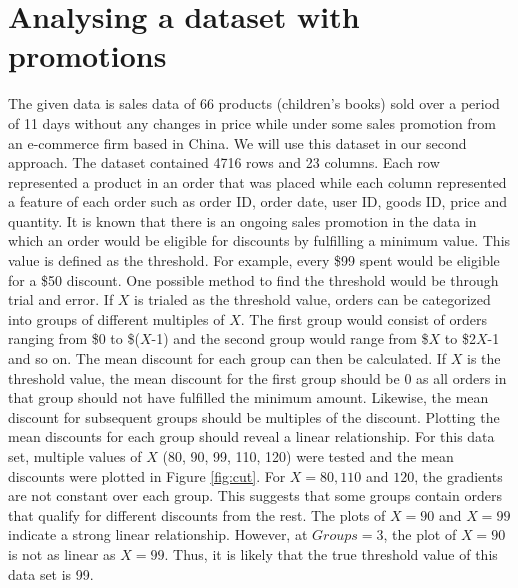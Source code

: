 \documentclass[a4paper]{article}
\begin{document}
\section{Analysing a dataset with promotions}
The given data is sales data of 66 products (children's books) sold over a period of 11 days without any changes in price while under some sales promotion from an e-commerce firm based in China. We will use this dataset in our second approach. The dataset contained 4716 rows and 23 columns. Each row represented a product in an order that was placed while each column represented a feature of each order such as order ID, order date, user ID, goods ID, price and quantity.
\newline
\newline
It is known that there is an ongoing sales promotion in the data in which an order would be eligible for discounts by fulfilling a minimum value. This value is defined as the threshold. For example, every \$99 spent would be eligible for a \$50 discount. One possible method to find the threshold would be through trial and error.
\newline
\newline
If $X$ is trialed as the threshold value, orders can be categorized into groups of different multiples of $X$. The first group would consist of orders ranging from \$0 to \$($X$-1) and the second group would range from \$$X$ to \$2$X$-1 and so on. The mean discount for each group can then be calculated. If $X$ is the threshold value, the mean discount for the first group should be 0 as all orders in that group should not have fulfilled the minimum amount. Likewise, the mean discount for subsequent groups should be multiples of the discount. Plotting the mean discounts for each group should reveal a linear relationship.
\newline
\newline
For this data set, multiple values of $X$ (80, 90, 99, 110, 120) were tested and the mean discounts were plotted in Figure \ref{fig:cut}. For $X = 80, 110$ and $120$, the gradients are not constant over each group. This suggests that some groups contain orders that qualify for different discounts from the rest. The plots of $X = 90$ and $X = 99$ indicate a strong linear relationship. However, at $Groups = 3$, the plot of $X = 90$ is not as linear as $X=99$. Thus, it is likely that the true threshold value of this data set is 99.
\end{document}
